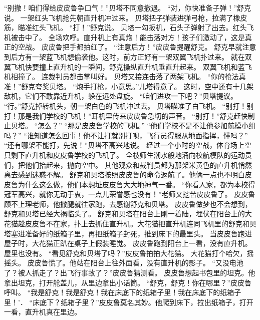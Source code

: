 \documentclass[a4paper,12pt,UTF8,twoside]{ctexbook}
\begin{document}
        “别撤！咱们得给皮皮鲁争口气！”贝塔不同意撤退。 
        “对，你快准备子弹！”舒克说。 
        一架红头飞机抢先朝直升机冲过来。 
        贝塔把子弹装进弹弓枪，拉满了橡皮筋，瞄准红头飞机。 
        “打！”舒克说。 
        贝塔一勾扳机，石头子弹射了出去。红头飞机被击中了。 
        全场欢呼。直升机上有真炮！能击落对方！孩子们激动了，这是真正的空战。 
        皮皮鲁把手都拍红了。 
        “注意后方！”皮皮鲁提醒舒克。 
        舒克早就注意到后方有一架蓝飞机想偷袭他。这时，前方正好有一架双翼飞机扑过来。 
        就在双翼飞机快要撞上直升机的一瞬间，舒克操纵直升机垂直升起来。 
        双翼飞机和蓝飞机相撞了。 
        连裁判员都击掌叫好。 
        贝塔又接连击落了两架飞机。 
        “你的枪法真准！”舒克夸奖贝塔。 
        “炮手打枪，小意思。”儿塔得意了。 
        这时，空中还有十几架敌机，它们不敢靠近升机，躲在远处盘旋。 
        “咱们进攻一下吧？”贝塔提议。 
        “行。”舒克掉转机头，朝一架白色的飞机冲过去。 
        贝塔瞄准了白飞机。 
        “别打！别打！那是我们学校的飞机！”耳机里传来皮皮鲁急切的声音。 
        “别打！”舒克赶快制止贝塔。 
        “怎么？” 
        “那是皮皮鲁学校的飞机。” 
        “他们学校不是不让他参加航模小组吗？” 
        “谁知道怎么回事！他不让打就别打呗，飞行员得服从地面指挥，懂吗？” 
        “还有哪架不能打，先说！”贝塔不高兴地说。 
        经过一个小时的空战，体育场上空只剩下直升机和皮皮鲁学校的飞机了。 
        全枝师生潮水般地涌向校航模队的运动员们，把他们抬起来，抛向空中。 
        其他观众和裁判员都为那架米黄色的直升机悄然离去感到迷惑不解。 
        舒克和贝塔按照皮皮鲁的命令返航了。他俩一点也不明白皮皮鲁为什么这么做，他们本想址皮皮鲁大大地神气一番。 
        “你看人家，都为本校得冠军高兴，就你无动于衷，一点儿荣誉感也没有！”老师又挖苦皮皮鲁了。 
        皮皮鲁顾不上理老师，他撒腿就往家跑，去感谢舒克和贝塔。 
        皮皮鲁做梦也不会想到，舒克和贝塔已经大祸临头了。 
        舒克和贝塔在阳台上刚一着陆，埋伏在阳台上的大花猫趁皮皮鲁不在家，扑上去抓住直升机。大花猫把直升机连同飞机里的舒克和贝塔塞进准备好的纸箱子里，再把纸箱子封死，推到床下的最里头。 
        当皮皮鲁跑进屋子时，大花猫正趴在桌子上假装睡觉。 
        皮皮鲁跑到阳台上一看，没有直升机。屋里也没有。 
        “看见舒克和贝塔了吗？”皮皮鲁拍拍大花猫。 
        大花猫打个哈欠，摇摇头。 
        皮皮鲁慌了。他站在阳台上往外面看，没有直升机的影子。 
        “又没电池了？被人抓走了？出飞行事故了？”皮皮鲁猜测看。 
        皮皮鲁想起书包里的坦克。他拿出坦克，打开舱盖儿，从里边拿出小话筒。 
        “舒克，舒克！你在哪里？”皮皮鲁呼叫。 
        “我是舒克！我是舒克！我在床底下的纸箱子里！我在床底下的纸箱子里！'． 
        “床底下？纸箱子里？”皮皮鲁莫名其妙。他爬到床下，拉出纸箱子，打开一看，直升机真在里边。 
\end{document}

